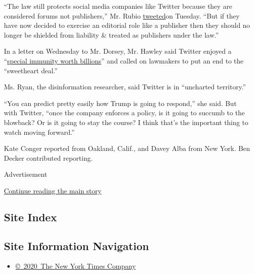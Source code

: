 ``The law still protects social media companies like Twitter because
they are considered forums not publishers,'' Mr. Rubio
\href{https://twitter.com/marcorubio/status/1265442093641732096}{tweeted}on
Tuesday. ``But if they have now decided to exercise an editorial role
like a publisher then they should no longer be shielded from liability
\& treated as publishers under the law.''

In a letter on Wednesday to Mr. Dorsey, Mr. Hawley said Twitter enjoyed
a
``\href{https://twitter.com/HawleyMO/status/1265444047365312515}{special
immunity worth billions}'' and called on lawmakers to put an end to the
``sweetheart deal.''

Ms. Ryan, the disinformation researcher, said Twitter is in ``uncharted
territory.''

``You can predict pretty easily how Trump is going to respond,'' she
said. But with Twitter, ``once the company enforces a policy, is it
going to succumb to the blowback? Or is it going to stay the course? I
think that's the important thing to watch moving forward.''

Kate Conger reported from Oakland, Calif., and Davey Alba from New York.
Ben Decker contributed reporting.

Advertisement

\protect\hyperlink{after-bottom}{Continue reading the main story}

\hypertarget{site-index}{%
\subsection{Site Index}\label{site-index}}

\hypertarget{site-information-navigation}{%
\subsection{Site Information
Navigation}\label{site-information-navigation}}

\begin{itemize}
\tightlist
\item
  \href{https://help.nytimes.com/hc/en-us/articles/115014792127-Copyright-notice}{©~2020~The
  New York Times Company}
\end{itemize}

